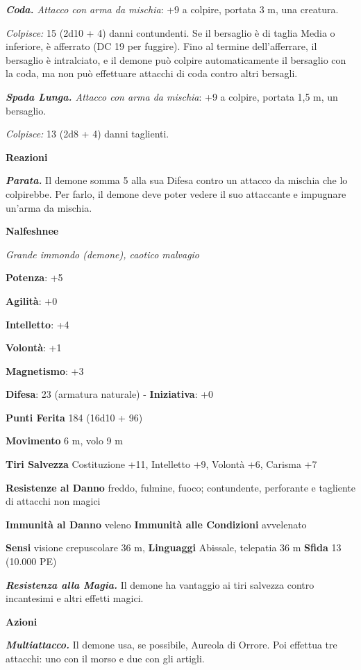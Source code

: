 \begin{multicols}{2}
\emph{\textbf{Coda.} Attacco con arma da mischia}: +9 a colpire, portata
3 m, una creatura.

\emph{Colpisce:} 15 (2d10 + 4) danni contundenti. Se il bersaglio è di
taglia Media o inferiore, è afferrato (DC 19 per fuggire). Fino al
termine dell'afferrare, il bersaglio è intralciato, e il demone può
colpire automaticamente il bersaglio con la coda, ma non può effettuare
attacchi di coda contro altri bersagli.

\emph{\textbf{Spada Lunga.} Attacco con arma da mischia}: +9 a colpire,
portata 1,5 m, un bersaglio.

\emph{Colpisce:} 13 (2d8 + 4) danni taglienti.

\textbf{Reazioni}

\emph{\textbf{Parata.}} Il demone somma 5 alla sua Difesa contro un attacco
da mischia che lo colpirebbe. Per farlo, il demone deve poter vedere il
suo attaccante e impugnare un'arma da mischia.

\textbf{Nalfeshnee}

\emph{Grande immondo (demone), caotico malvagio}

\textbf{Potenza}: +5

\textbf{Agilità}: +0

\textbf{Intelletto}: +4

\textbf{Volontà}: +1

\textbf{Magnetismo}: +3

\textbf{Difesa}: 23 (armatura naturale) - \textbf{Iniziativa}: +0

\textbf{Punti Ferita} 184 (16d10 + 96)

\textbf{Movimento} 6 m, volo 9 m

\textbf{Tiri Salvezza} Costituzione +11, Intelletto +9, Volontà +6,
Carisma +7

\textbf{Resistenze al Danno} freddo, fulmine, fuoco; contundente,
perforante e tagliente di attacchi non magici

\textbf{Immunità al Danno} veleno \textbf{Immunità alle Condizioni}
avvelenato

\textbf{Sensi} visione crepuscolare 36 m, 
\textbf{Linguaggi} Abissale, telepatia 36 m \textbf{Sfida} 13 (10.000
PE)

\emph{\textbf{Resistenza alla Magia.}} Il demone ha vantaggio ai tiri
salvezza contro incantesimi e altri effetti magici.

\textbf{Azioni}

\emph{\textbf{Multiattacco.}} Il demone usa, se possibile, Aureola di
Orrore. Poi effettua tre attacchi: uno con il morso e due con gli
artigli.


\end{multicols}
